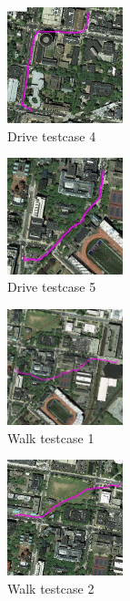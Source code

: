 \documentclass[letterpaper,twocolumn,10pt]{article}
\begin{document}
\begin{figure}[h]
    \centering
    \includegraphics[width=0.3\textwidth]{results/test_drive4.jpg}
    \caption{Drive testcase 4}
\end{figure}

\begin{figure}[h]
    \centering
    \includegraphics[width=0.3\textwidth]{results/test_drive5.jpg}
    \caption{Drive testcase 5}
\end{figure}

\begin{figure}[h]
    \centering
    \includegraphics[width=0.3\textwidth]{results/test_walk1.jpg}
    \caption{Walk testcase 1}
\end{figure}

\begin{figure}[h]
    \centering
    \includegraphics[width=0.3\textwidth]{results/test_walk2.jpg}
    \caption{Walk testcase 2}
\end{figure}
\end{document}
